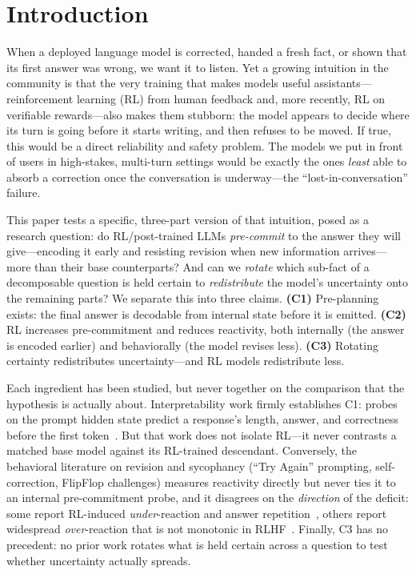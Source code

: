 \section{Introduction}
\label{sec:intro}

When a deployed language model is corrected, handed a fresh fact, or shown that its first
answer was wrong, we want it to listen. Yet a growing intuition in the community is that the
very training that makes models useful assistants---reinforcement learning (RL) from human
feedback and, more recently, RL on verifiable rewards---also makes them stubborn: the model
appears to decide where its turn is going before it starts writing, and then refuses to be
moved. If true, this would be a direct reliability and safety problem. The models we put in
front of users in high-stakes, multi-turn settings would be exactly the ones \emph{least}
able to absorb a correction once the conversation is underway---the ``lost-in-conversation''
failure.

 This paper tests a specific, three-part version of that intuition,
posed as a research question: do RL/post-trained LLMs \emph{pre-commit} to the answer they
will give---encoding it early and resisting revision when new information arrives---more than
their base counterparts? And can we \emph{rotate} which sub-fact of a decomposable question
is held certain to \emph{redistribute} the model's uncertainty onto the remaining parts? We
separate this into three claims. \textbf{(C1)} Pre-planning exists: the final answer is
decodable from internal state before it is emitted. \textbf{(C2)} RL increases
pre-commitment and reduces reactivity, both internally (the answer is encoded earlier) and
behaviorally (the model revises less). \textbf{(C3)} Rotating certainty redistributes
uncertainty---and RL models redistribute less.

 Each ingredient has been studied, but never together on the comparison that
the hypothesis is actually about. Interpretability work firmly establishes C1: probes on the
prompt hidden state predict a response's length, answer, and correctness before the first
token~\citep{dong2025emergent,pal2023future,bigelow2025planning}. But that work does not
isolate RL---it never contrasts a matched base model against its RL-trained descendant.
Conversely, the behavioral literature on revision and sycophancy (\eg ``Try Again''
prompting, self-correction, FlipFlop challenges) measures reactivity directly but never ties
it to an internal pre-commitment probe, and it disagrees on the \emph{direction} of the
deficit: some report RL-induced \emph{under}-reaction and answer
repetition~\citep{ufo2025,kumar2024score}, others report widespread \emph{over}-reaction that
is not monotonic in RLHF~\citep{laban2023flipflop}. Finally, C3 has no precedent: no prior
work rotates what is held certain across a question to test whether uncertainty actually
spreads.

